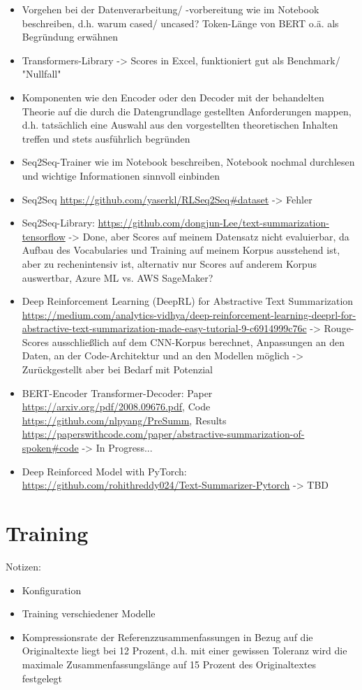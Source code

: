 \begin{itemize}
	\item Vorgehen bei der Datenverarbeitung/ -vorbereitung wie im Notebook beschreiben, d.h. warum cased/ uncased? Token-Länge von BERT o.ä. als Begründung erwähnen
	\item Transformers-Library -> Scores in Excel, funktioniert gut als Benchmark/ "Nullfall"
	\item Komponenten wie den Encoder oder den Decoder mit der behandelten Theorie auf die durch die Datengrundlage gestellten Anforderungen mappen, d.h. tatsächlich eine Auswahl aus den vorgestellten theoretischen Inhalten treffen und stets ausführlich begründen
	\item Seq2Seq-Trainer wie im Notebook beschreiben, Notebook nochmal durchlesen und wichtige Informationen sinnvoll einbinden
	\item Seq2Seq \url{https://github.com/yaserkl/RLSeq2Seq#dataset} -> Fehler
	\item Seq2Seq-Library: \url{https://github.com/dongjun-Lee/text-summarization-tensorflow} -> Done, aber Scores auf meinem Datensatz nicht evaluierbar, da Aufbau des Vocabularies und Training auf meinem Korpus ausstehend ist, aber zu rechenintensiv ist, alternativ nur Scores auf anderem Korpus auswertbar, Azure ML vs. AWS SageMaker?
	\item Deep Reinforcement Learning (DeepRL) for Abstractive Text Summarization \url{https://medium.com/analytics-vidhya/deep-reinforcement-learning-deeprl-for-abstractive-text-summarization-made-easy-tutorial-9-c6914999c76c} -> Rouge-Scores ausschließlich auf dem CNN-Korpus berechnet, Anpassungen an den Daten, an der Code-Architektur und an den Modellen möglich -> Zurückgestellt aber bei Bedarf mit Potenzial
	\item BERT-Encoder Transformer-Decoder: Paper \url{https://arxiv.org/pdf/2008.09676.pdf}, Code \url{https://github.com/nlpyang/PreSumm}, Results \url{https://paperswithcode.com/paper/abstractive-summarization-of-spoken#code} -> In Progress...
	\item Deep Reinforced Model with PyTorch: \url{https://github.com/rohithreddy024/Text-Summarizer-Pytorch} -> TBD
\end{itemize}


\section{Training}
Notizen:
\begin{itemize}
	\item Konfiguration
	\item Training verschiedener Modelle
	\item Kompressionsrate der Referenzzusammenfassungen in Bezug auf die Originaltexte liegt bei 12 Prozent, d.h. mit einer gewissen Toleranz wird die maximale Zusammenfassungslänge auf 15 Prozent des Originaltextes festgelegt
\end{itemize}


